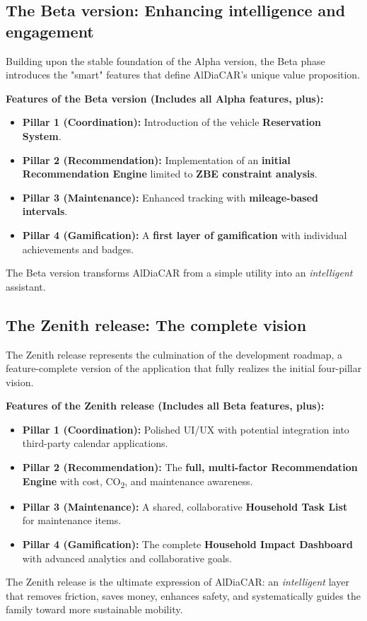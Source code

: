 \subsection{The Beta version: Enhancing intelligence and engagement}
Building upon the stable foundation of the Alpha version, the Beta phase introduces the "smart" features that define AlDiaCAR's unique value proposition.
\textgap

\textbf{Features of the Beta version (Includes all Alpha features, plus):}
\begin{itemize}
\item \textbf{Pillar 1 (Coordination):} Introduction of the vehicle \textbf{Reservation System}.
\item \textbf{Pillar 2 (Recommendation):} Implementation of an \textbf{initial Recommendation Engine} limited to \textbf{ZBE constraint analysis}.
\item \textbf{Pillar 3 (Maintenance):} Enhanced tracking with \textbf{mileage-based intervals}.
\item \textbf{Pillar 4 (Gamification):} A \textbf{first layer of gamification} with individual achievements and badges.
\end{itemize}
The Beta version transforms AlDiaCAR from a simple utility into an \textit{intelligent} assistant.

\subsection{The Zenith release: The complete vision}
The Zenith release represents the culmination of the development roadmap, a feature-complete version of the application that fully realizes the initial four-pillar vision.
\textgap

\textbf{Features of the Zenith release (Includes all Beta features, plus):}
\begin{itemize}
\item \textbf{Pillar 1 (Coordination):} Polished UI/UX with potential integration into third-party calendar applications.
\item \textbf{Pillar 2 (Recommendation):} The \textbf{full, multi-factor Recommendation Engine} with cost, CO\textsubscript{2}, and maintenance awareness.
\item \textbf{Pillar 3 (Maintenance):} A shared, collaborative \textbf{Household Task List} for maintenance items.
\item \textbf{Pillar 4 (Gamification):} The complete \textbf{Household Impact Dashboard} with advanced analytics and collaborative goals.
\end{itemize}
The Zenith release is the ultimate expression of AlDiaCAR: an \textit{intelligent} layer that removes friction, saves money, enhances safety, and systematically guides the family toward more sustainable mobility.
